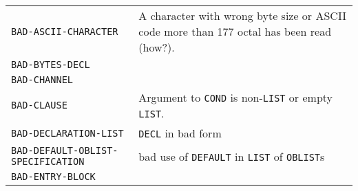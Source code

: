 \documentclass[a4paper,]{article}
\begin{document}
\begin{longtable}[]{@{}ll@{}}
\begin{minipage}[t]{0.58\columnwidth}\raggedright\strut
\texttt{BAD-ASCII-CHARACTER}\strut
\end{minipage} & \begin{minipage}[t]{0.36\columnwidth}\raggedright\strut
A character with wrong byte size or ASCII code more than 177 octal has been read (how?).\strut
\end{minipage}\tabularnewline
\begin{minipage}[t]{0.58\columnwidth}\raggedright\strut
\texttt{BAD-BYTES-DECL}\strut
\end{minipage} & \begin{minipage}[t]{0.36\columnwidth}\raggedright\strut
\strut
\end{minipage}\tabularnewline
\begin{minipage}[t]{0.58\columnwidth}\raggedright\strut
\texttt{BAD-CHANNEL}\strut
\end{minipage} & \begin{minipage}[t]{0.36\columnwidth}\raggedright\strut
\strut
\end{minipage}\tabularnewline
\begin{minipage}[t]{0.58\columnwidth}\raggedright\strut
\texttt{BAD-CLAUSE}\strut
\end{minipage} & \begin{minipage}[t]{0.36\columnwidth}\raggedright\strut
Argument to \texttt{COND} is non-\texttt{LIST} or empty \texttt{LIST}.\strut
\end{minipage}\tabularnewline
\begin{minipage}[t]{0.58\columnwidth}\raggedright\strut
\texttt{BAD-DECLARATION-LIST}\strut
\end{minipage} & \begin{minipage}[t]{0.36\columnwidth}\raggedright\strut
\texttt{DECL} in bad form\strut
\end{minipage}\tabularnewline
\begin{minipage}[t]{0.58\columnwidth}\raggedright\strut
\texttt{BAD-DEFAULT-OBLIST-SPECIFICATION}\strut
\end{minipage} & \begin{minipage}[t]{0.36\columnwidth}\raggedright\strut
bad use of \texttt{DEFAULT} in \texttt{LIST} of \texttt{OBLIST}s\strut
\end{minipage}\tabularnewline
\begin{minipage}[t]{0.58\columnwidth}\raggedright\strut
\texttt{BAD-ENTRY-BLOCK}\strut
\end{minipage} & \begin{minipage}[t]{0.36\columnwidth}\raggedright\strut

\end{minipage}
\end{longtable}
\end{document}

